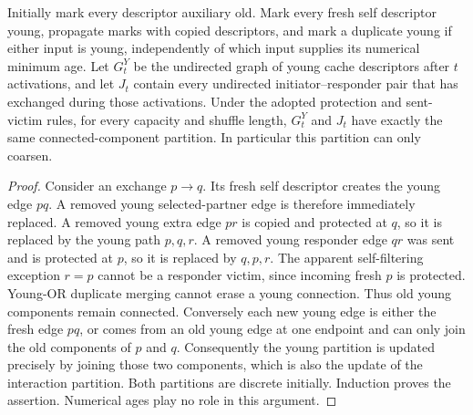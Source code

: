 \begin{lemma}
\label{lem:younginteractioncomponents}
Initially mark every descriptor auxiliary old. Mark every fresh
self descriptor young, propagate marks with copied descriptors,
and mark a duplicate young if either input is young, independently
of which input supplies its numerical minimum age.
Let $G_t^Y$ be the undirected graph of young cache descriptors
after $t$ activations, and let $J_t$ contain every undirected
initiator--responder pair that has exchanged during those activations.
Under the adopted protection and sent-victim rules, for every
capacity and shuffle length, $G_t^Y$ and $J_t$ have exactly the
same connected-component partition. In particular this partition
can only coarsen.
\end{lemma}
\begin{proof}
Consider an exchange $p\to q$. Its fresh self descriptor creates
the young edge $pq$. A removed young selected-partner edge is
therefore immediately replaced. A removed young extra edge $pr$
is copied and protected at $q$, so it is replaced by the young
path $p,q,r$. A removed young responder edge $qr$ was sent and
is protected at $p$, so it is replaced by $q,p,r$.
The apparent self-filtering exception $r=p$ cannot be a responder
victim, since incoming fresh $p$ is protected. Young-OR duplicate
merging cannot erase a young connection. Thus old young components
remain connected. Conversely each new young edge is either the
fresh edge $pq$, or comes from an old young edge at one endpoint
and can only join the old components of $p$ and $q$.
Consequently the young partition is updated precisely by joining
those two components, which is also the update of the interaction
partition. Both partitions are discrete initially. Induction proves
the assertion. Numerical ages play no role in this argument.
\end{proof}

